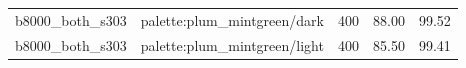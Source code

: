 \begin{longtable}{l>{\raggedright\arraybackslash}p{.42\linewidth}rrr}
b8000\_\allowbreak{}both\_\allowbreak{}s303 & %
palette:plum\_\allowbreak{}mintgreen/dark & %
400 & %
88.00 & %
99.52 \\ %

b8000\_\allowbreak{}both\_\allowbreak{}s303 & %
palette:plum\_\allowbreak{}mintgreen/light & %
400 & %
85.50 & %
99.41 \\ %


\end{longtable}
